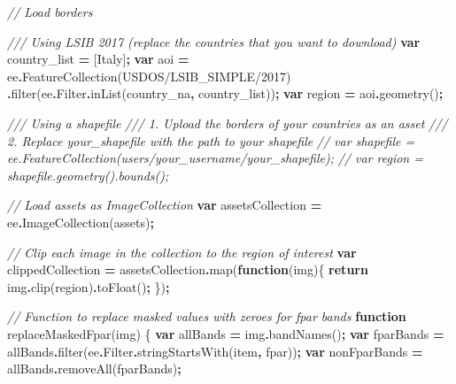 \documentclass[
  10pt,
  b5paper,
  oneside]{book}
\newenvironment{Shaded}{\begin{snugshade}}{\end{snugshade}}
\newcommand{\AttributeTok}[1]{\textcolor[rgb]{0.77,0.63,0.00}{#1}}
\newcommand{\CommentTok}[1]{\textcolor[rgb]{0.56,0.35,0.01}{\textit{#1}}}
\newcommand{\ControlFlowTok}[1]{\textcolor[rgb]{0.13,0.29,0.53}{\textbf{#1}}}
\newcommand{\FunctionTok}[1]{\textcolor[rgb]{0.00,0.00,0.00}{#1}}
\newcommand{\KeywordTok}[1]{\textcolor[rgb]{0.13,0.29,0.53}{\textbf{#1}}}
\newcommand{\NormalTok}[1]{#1}
\newcommand{\OperatorTok}[1]{\textcolor[rgb]{0.81,0.36,0.00}{\textbf{#1}}}
\newcommand{\StringTok}[1]{\textcolor[rgb]{0.31,0.60,0.02}{#1}}
\begin{document}
\begin{Shaded}
\begin{Highlighting}[]
\CommentTok{// Load borders }

\CommentTok{/// Using LSIB 2017 (replace the countries that you want to download)}
\KeywordTok{var}\NormalTok{ country\_list }\OperatorTok{=}\NormalTok{ [}\StringTok{\textquotesingle{}Italy\textquotesingle{}}\NormalTok{]}\OperatorTok{;}
\KeywordTok{var}\NormalTok{ aoi }\OperatorTok{=}\NormalTok{ ee}\OperatorTok{.}\FunctionTok{FeatureCollection}\NormalTok{(}\StringTok{\textquotesingle{}USDOS/LSIB\_SIMPLE/2017\textquotesingle{}}\NormalTok{)}
  \OperatorTok{.}\FunctionTok{filter}\NormalTok{(ee}\OperatorTok{.}\AttributeTok{Filter}\OperatorTok{.}\FunctionTok{inList}\NormalTok{(}\StringTok{\textquotesingle{}country\_na\textquotesingle{}}\OperatorTok{,}\NormalTok{ country\_list))}\OperatorTok{;}
\KeywordTok{var}\NormalTok{ region }\OperatorTok{=}\NormalTok{ aoi}\OperatorTok{.}\FunctionTok{geometry}\NormalTok{()}\OperatorTok{;}

\CommentTok{/// Using a shapefile}
\CommentTok{/// 1. Upload the borders of your countries as an asset}
\CommentTok{/// 2. Replace \textquotesingle{}your\_shapefile\textquotesingle{} with the path to your shapefile}
\CommentTok{// var shapefile = ee.FeatureCollection(\textquotesingle{}users/your\_username/your\_shapefile\textquotesingle{});}
\CommentTok{// var region = shapefile.geometry().bounds();}


\CommentTok{// Load assets as ImageCollection}
\KeywordTok{var}\NormalTok{ assetsCollection }\OperatorTok{=}\NormalTok{ ee}\OperatorTok{.}\FunctionTok{ImageCollection}\NormalTok{(assets)}\OperatorTok{;}

\CommentTok{// Clip each image in the collection to the region of interest}
\KeywordTok{var}\NormalTok{ clippedCollection }\OperatorTok{=}\NormalTok{ assetsCollection}\OperatorTok{.}\FunctionTok{map}\NormalTok{(}\KeywordTok{function}\NormalTok{(img)\{}
  \ControlFlowTok{return}\NormalTok{ img}\OperatorTok{.}\FunctionTok{clip}\NormalTok{(region)}\OperatorTok{.}\FunctionTok{toFloat}\NormalTok{()}\OperatorTok{;}
\NormalTok{\})}\OperatorTok{;}

\CommentTok{// Function to replace masked values with zeroes for fpar bands}
\KeywordTok{function} \FunctionTok{replaceMaskedFpar}\NormalTok{(img) \{}
  \KeywordTok{var}\NormalTok{ allBands }\OperatorTok{=}\NormalTok{ img}\OperatorTok{.}\FunctionTok{bandNames}\NormalTok{()}\OperatorTok{;}
  \KeywordTok{var}\NormalTok{ fparBands }\OperatorTok{=}\NormalTok{ allBands}\OperatorTok{.}\FunctionTok{filter}\NormalTok{(ee}\OperatorTok{.}\AttributeTok{Filter}\OperatorTok{.}\FunctionTok{stringStartsWith}\NormalTok{(}\StringTok{\textquotesingle{}item\textquotesingle{}}\OperatorTok{,} \StringTok{\textquotesingle{}fpar\textquotesingle{}}\NormalTok{))}\OperatorTok{;}
  \KeywordTok{var}\NormalTok{ nonFparBands }\OperatorTok{=}\NormalTok{ allBands}\OperatorTok{.}\FunctionTok{removeAll}\NormalTok{(fparBands)}\OperatorTok{;}
  

\end{Highlighting}
\end{Shaded}
\end{document}

